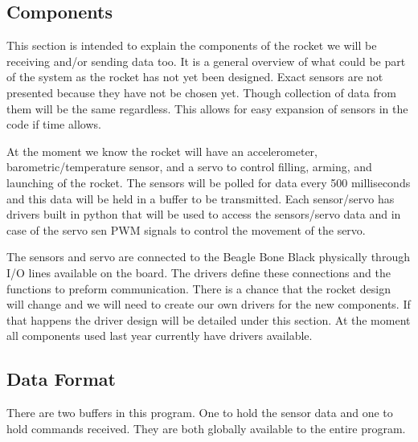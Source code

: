 \documentclass[10pt,draftclsnofoot,onecolumn,compsoc]{IEEEtran}
\begin{document}
\subsection{Components} 
This section is intended to explain the components of the rocket we will be receiving and/or sending data too. It is a general overview of what could be part of the system as the rocket has not yet been designed. Exact sensors are not presented because they have not be chosen yet. Though collection of data from them will be the same regardless. This allows for easy expansion of sensors in the code if time allows.\par
At the moment we know the rocket will have an accelerometer, barometric/temperature sensor, and a servo to control filling, arming, and launching of the rocket. The sensors will be polled for data every 500 milliseconds and this data will be held in a buffer to be transmitted. Each sensor/servo has drivers built in python that will be used to access the sensors/servo data and in case of the servo sen PWM signals to control the movement of the servo.\par
The sensors and servo are connected to the Beagle Bone Black physically through I/O lines available on the board. The drivers define these connections and the functions to preform communication. There is a chance that the rocket design will change and we will need to create our own drivers for the new components. If that happens the driver design will be detailed under this section. At the moment all components used last year currently have drivers available.\par
\subsection{Data Format}
There are two buffers in this program. One to hold the sensor data and one to hold commands received. They are both globally available to the entire program.
\end{document}
